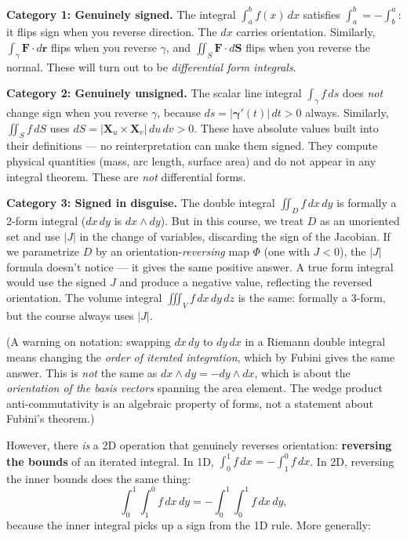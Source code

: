 \documentclass[11pt]{report}
\begin{document}
\textbf{Category 1: Genuinely signed.} The integral $\int_a^b f(x)\,dx$ satisfies $\int_a^b = -\int_b^a$: it flips sign when you reverse direction. The $dx$ carries orientation. Similarly, $\int_\gamma \mathbf{F} \cdot d\mathbf{r}$ flips when you reverse $\gamma$, and $\iint_S \mathbf{F} \cdot d\mathbf{S}$ flips when you reverse the normal. These will turn out to be \textit{differential form integrals}.

\textbf{Category 2: Genuinely unsigned.} The scalar line integral $\int_\gamma f\,ds$ does \textit{not} change sign when you reverse $\gamma$, because $ds = |\boldsymbol{\gamma}'(t)|\,dt > 0$ always. Similarly, $\iint_S f\,dS$ uses $dS = |\mathbf{X}_u \times \mathbf{X}_v|\,du\,dv > 0$. These have absolute values built into their definitions --- no reinterpretation can make them signed. They compute physical quantities (mass, arc length, surface area) and do not appear in any integral theorem. These are \textit{not} differential forms.

\textbf{Category 3: Signed in disguise.} The double integral $\iint_D f\,dx\,dy$ is formally a 2-form integral ($dx\,dy$ is $dx \wedge dy$). But in this course, we treat $D$ as an unoriented set and use $|J|$ in the change of variables, discarding the sign of the Jacobian. If we parametrize $D$ by an orientation-\textit{reversing} map $\Phi$ (one with $J < 0$), the $|J|$ formula doesn't notice --- it gives the same positive answer. A true form integral would use the signed $J$ and produce a negative value, reflecting the reversed orientation. The volume integral $\iiint_V f\,dx\,dy\,dz$ is the same: formally a 3-form, but the course always uses $|J|$.

(A warning on notation: swapping $dx\,dy$ to $dy\,dx$ in a Riemann double integral means changing the \textit{order of iterated integration}, which by Fubini gives the same answer. This is \textit{not} the same as $dx \wedge dy = -dy \wedge dx$, which is about the \textit{orientation of the basis vectors} spanning the area element. The wedge product anti-commutativity is an algebraic property of forms, not a statement about Fubini's theorem.)

However, there \textit{is} a 2D operation that genuinely reverses orientation: \textbf{reversing the bounds} of an iterated integral. In 1D, $\int_0^1 f\,dx = -\int_1^0 f\,dx$. In 2D, reversing the inner bounds does the same thing:
\[
\int_0^1\!\!\int_1^0 f\,dx\,dy = -\int_0^1\!\!\int_0^1 f\,dx\,dy,
\]
because the inner integral picks up a sign from the 1D rule. More generally:
\end{document}
